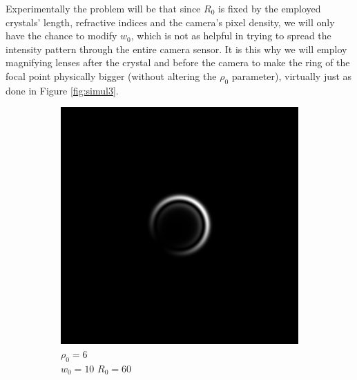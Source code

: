 \documentclass[11pt, a4paper, twoside]{article} %
\begin{document}
Experimentally the problem will be that since $R_0$ is fixed by the employed crystals' length, refractive indices and the camera's pixel density, we will only have the chance to modify $w_0$, which is not as helpful in trying to spread the intensity pattern through the entire camera sensor. It is this why we will employ magnifying lenses after the crystal and before the camera to make the ring of the focal point physically bigger (without altering the $\rho_0$ parameter), virtually just as done in Figure \ref{fig:simul3}.
\begin{figure}[h!] 
     \centering 
    \begin{subfigure}[b]{0.245\linewidth}
    \includegraphics[width=\linewidth]{simul31.png}
    \caption{$\rho_0=6$\\ $w_0=10$ $R_0=60$}
     \end{subfigure}
 \begin{subfigure}[b]{0.245\linewidth}

\end{subfigure}
\end{figure}
\end{document}
